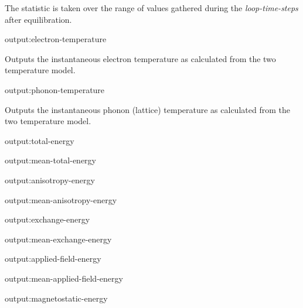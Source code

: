 The statistic is taken over the range of values gathered during the \textit{loop-time-steps} after equilibration.

{\zicf output:electron-temperature} Outputs the instantaneous electron temperature as calculated from the two temperature model.

{\zicf output:phonon-temperature} Outputs the instantaneous phonon (lattice) temperature as calculated from the two temperature model.




{\zicf output:total-energy}

{\zicf output:mean-total-energy}

{\zicf output:anisotropy-energy}

{\zicf output:mean-anisotropy-energy}

{\zicf output:exchange-energy}

{\zicf output:mean-exchange-energy}

{\zicf output:applied-field-energy}

{\zicf output:mean-applied-field-energy}

{\zicf output:magnetostatic-energy}

